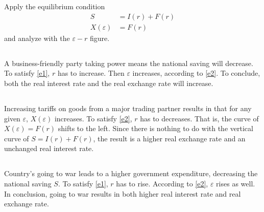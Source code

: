 \documentclass{article}
\renewcommand{\thesubsection}{(\arabic{subsection}).}
\begin{document}
\section{}
Apply the equilibrium condition
\begin{align}
    S &= I(r) + F(r) \label{e1} \\
    X(\varepsilon) &= F(r) \label{e2}
\end{align}
and analyze with the $\varepsilon - r$ figure.

\subsection{}
A business-friendly party taking power means the national saving will decrease. To satisfy \eqref{e1}, $r$ has to increase. Then $\varepsilon$ increases, according to \eqref{e2}. To conclude, both the real interest rate and the real exchange rate will increase.

\subsection{}
Increasing tariffs on goods from a major trading partner results in that for any given $\varepsilon$, $X(\varepsilon)$ increases. To satisfy \eqref{e2}, $r$ has to decreases. That is, the curve of $X(\varepsilon) = F(r)$ shifts to the left. Since there is nothing to do with the vertical curve of $S = I(r) + F(r)$, the result is a higher real exchange rate and an unchanged real interest rate.

\subsection{}
Country's going to war leads to a higher government expenditure, decreasing the national saving $S$. To satisfy \eqref{e1}, $r$ has to rise. According to \eqref{e2}, $\varepsilon$ rises as well. In conclusion, going to war results in both higher real interest rate and real exchange rate. 

\renewcommand{\thesubsection}{(\alph{subsection}).}

\section{}
\end{document}
